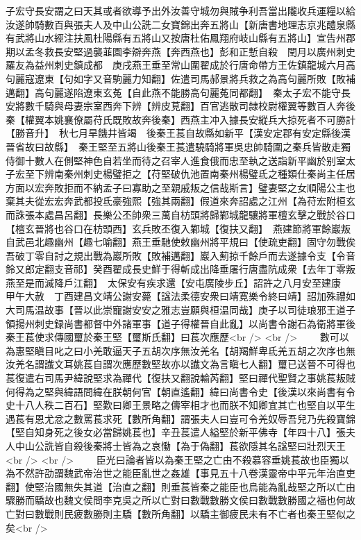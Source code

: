 子宏守長安謂之曰天其或者欲導予出外汝善守城勿與賊争利吾當出隴收兵運糧以給汝遂帥騎數百與張夫人及中山公詵二女寶錦出奔五將山【新唐書地理志京兆醴泉縣有武將山水經注扶風杜陽縣有五將山又按唐杜佑鳳翔府岐山縣有五將山】宣告州郡期以孟冬救長安堅過襲韮園李辯奔燕【奔西燕也】彭和正慙自殺　閏月以廣州刺史羅友為益州刺史鎮成都　庚戌燕王垂至常山圍翟成於行唐命帶方王佐鎮龍城六月高句麗寇遼東【句如字又音駒麗力知翻】佐遣司馬郝景將兵救之為高句麗所敗【敗補邁翻】高句麗遂陷遼東玄菟【自此燕不能勝高句麗菟同都翻】　秦太子宏不能守長安將數千騎與母妻宗室西奔下辨【辨皮莧翻】百官逃散司隸校尉權翼等數百人奔後秦【權翼本姚襄僚屬苻氏既敗故奔後秦】西燕主冲入據長安縱兵大掠死者不可勝計【勝音升】　秋七月旱饑井皆竭　後秦王萇自故縣如新平【漢安定郡有安定縣後漢晉省故曰故縣】　秦王堅至五將山後秦王萇遣驍騎將軍吳忠帥騎圍之秦兵皆散走獨侍御十數人在側堅神色自若坐而待之召宰人進食俄而忠至執之送詣新平幽於别室太子宏至下辨南秦州刺史楊璧拒之【苻堅破仇池置南秦州楊璧氐之種類仕秦尚主任居方面以宏奔敗拒而不納孟子曰寡助之至親戚叛之信哉斯言】璧妻堅之女順陽公主也棄其夫從宏宏奔武都投氐豪強熙【強其兩翻】假道來奔詔處之江州【為苻宏附桓玄而誅張本處昌呂翻】長樂公丕帥衆三萬自枋頭將歸鄴城龍驤將軍檀玄擊之戰於谷口【檀玄晉將也谷口在枋頭西】玄兵敗丕復入鄴城【復扶又翻】　燕建節將軍餘巖叛自武邑北趣幽州【趣七喻翻】燕王垂馳使敕幽州將平規曰【使疏吏翻】固守勿戰俟吾破丁零自討之規出戰為巖所敗【敗補邁翻】巖入薊掠千餘戶而去遂據令支【令音鈴又郎定翻支音祁】癸酉翟成長史鮮于得斬成出降垂屠行唐盡阬成衆【去年丁零叛燕至是而滅降戶江翻】　太保安有疾求還【安屯廣陵步丘】詔許之八月安至建康　甲午大赦　丁酉建昌文靖公謝安薨【諡法柔德安衆曰靖寛樂令終曰靖】詔加殊禮如大司馬温故事【晉以此崇寵謝安安之雅志豈願與桓温同哉】庚子以司徒琅邪王道子領揚州刺史録尚書都督中外諸軍事【道子得權晉自此亂】以尚書令謝石為衛將軍後秦王萇使求傳國璽於秦王堅【璽斯氏翻】曰萇次應歷<br />
<br />
　　數可以為惠堅瞋目叱之曰小羌敢逼天子五胡次序無汝羌名【胡羯鮮卑氐羌五胡之次序也無汝羌名謂䜟文耳姚萇自謂次應歷數堅故亦以䜟文為言瞋七人翻】璽已送晉不可得也萇復遣右司馬尹緯說堅求為禪代【復扶又翻說輸芮翻】堅曰禪代聖賢之事姚萇叛賊何得為之堅與緯語問緯在朕朝何官【朝直遙翻】緯曰尚書令史【後漢以來尚書有令史十八人秩二百石】堅歎曰卿王景略之儔宰相才也而朕不知卿宜其亡也堅自以平生遇萇有恩尤忿之數罵萇求死【數所角翻】謂張夫人曰豈可令羌奴辱吾兒乃先殺寶錦【堅自知身死之後女必當歸姚萇也】辛丑萇遣人縊堅於新平佛寺【年四十八】張夫人中山公詵皆自殺後秦將士皆為之哀慟【為于偽翻】萇欲隱其名諡堅曰壯烈天王<br />
<br />
　　臣光曰論者皆以為秦王堅之亡由不殺慕容垂姚萇故也臣獨以為不然許劭謂魏武帝治世之能臣亂世之姦雄【事見五十八卷漢靈帝中平元年治直吏翻】使堅治國無失其道【治直之翻】則垂萇皆秦之能臣也烏能為亂哉堅之所以亡由驟勝而驕故也魏文侯問李克吳之所以亡對曰數戰數勝文侯曰數戰數勝國之福也何故亡對曰數戰則民疲數勝則主驕【數所角翻】以驕主御疲民未有不亡者也秦王堅似之矣<br />
